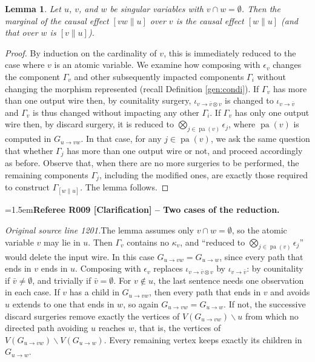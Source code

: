 \documentclass[12pt]{amsart}
\newcommand{\RefereeRemark}[4]{%
  \par\medskip\begingroup\normalfont\small\color{RefereePurple}%
  \emergencystretch=1.5em\noindent\textbf{Referee R#1 [#2] -- #3.}\par\nobreak\noindent #4\par
  \endgroup\medskip
}
\theoremstyle{plain}
\newtheorem{lem}[thm]{Lemma}
\theoremstyle{definition}
\theoremstyle{remark}
\numberwithin{equation}{section}
\theoremstyle{plain}
\newcommand{\0}{\emptyset}
\newcommand{\mi}{\smallsetminus}
\DeclareMathOperator{\pa}{pa}
\newcommand{\stri}{\Gamma}
\begin{document}
\begin{lem}\label{three:cau:mar}
Let  $u$, $v$, and $w$ be singular variables with $v \cap w = \0$. Then the marginal of the causal effect $[vw \| u]$ over $v$ is the causal effect $[w \| u]$ (and that over $w$ is $[v \| u]$).
\end{lem}
\begin{proof}
By induction on the cardinality of $v$, this is immediately reduced to the case where $v$ is an atomic variable. We examine how composing with $\epsilon_{v}$ changes the component $\stri_v$ and other subsequently impacted components $\stri_i$  without changing the morphism represented (recall Definition \ref{gen:condi}). If $\stri_v$ has more than one output wire then, by  counitality surgery,  $\iota_{v \rightarrow \bar v \otimes v} $ is changed to $\iota_{v \rightarrow \bar v} $ and $\stri_v$ is thus changed without impacting any other $\stri_i$. If $\stri_v$ has only one output wire then, by discard surgery, it is reduced to $\bigotimes_{j \in \pa(v)} \epsilon_{j}$, where $\pa(v)$ is computed in $G_{u \rightarrow vw}$. In that case, for any $j \in \pa(v)$, we ask the same question that whether $\stri_j$ has more than one output wire or not, and proceed accordingly as before. Observe that, when there are no more surgeries to be performed, the remaining components $\stri_j$, including the modified ones, are exactly those required to construct $\stri_{[w \| u]}$. The lemma follows.
\end{proof}
\hypertarget{review-009}{}\RefereeRemark{009}{Clarification}{Two cases of the reduction}{%
\textit{Original source line 1201.}\quad The lemma assumes only $v \cap w = \0$, so the atomic variable $v$ may lie in $u$. Then $\stri_v$ contains no $\kappa_v$, and ``reduced to $\bigotimes_{j \in \pa(v)} \epsilon_j$'' would delete the input wire. In this case $G_{u \rightarrow vw} = G_{u \rightarrow w}$, since every path that ends in $v$ ends in $u$. Composing with $\epsilon_v$ replaces $\iota_{v \rightarrow \bar v \otimes v}$ by $\iota_{v \rightarrow \bar v}$: by counitality if $\bar v \neq \0$, and trivially if $\bar v = \0$. For $v \notin u$, the last sentence needs one observation in each case. If $v$ has a child in $G_{u \rightarrow vw}$, then every path that ends in $v$ and avoids $u$ extends to one that ends in $w$, so again $G_{u \rightarrow vw} = G_{u \rightarrow w}$. If not, the successive discard surgeries remove exactly the vertices of $V(G_{u \rightarrow vw}) \mi u$ from which no directed path avoiding $u$ reaches $w$, that is, the vertices of $V(G_{u \rightarrow vw}) \mi V(G_{u \rightarrow w})$. Every remaining vertex keeps exactly its children in $G_{u \rightarrow w}$.
}
\end{document}

